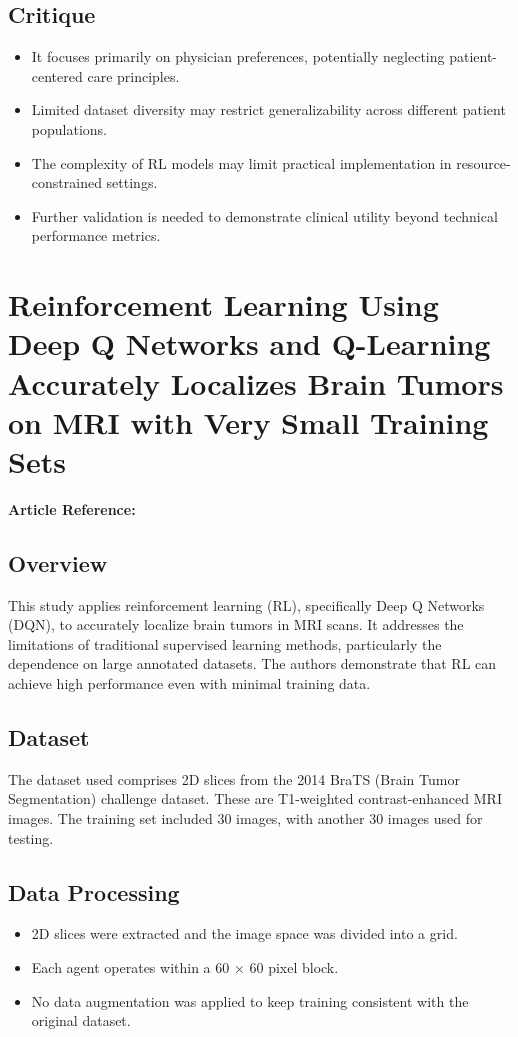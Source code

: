 \subsection*{Critique}
\begin{itemize}
    \item It focuses primarily on physician preferences, potentially neglecting patient-centered care principles.
    \item Limited dataset diversity may restrict generalizability across different patient populations.
    \item The complexity of RL models may limit practical implementation in resource-constrained settings.
    \item Further validation is needed to demonstrate clinical utility beyond technical performance metrics.
\end{itemize}


\section{Reinforcement Learning Using Deep Q Networks and Q-Learning Accurately Localizes Brain Tumors on MRI with Very Small Training Sets}
\textbf{Article Reference:} \cite{article_12}

\subsection*{Overview}
This study applies reinforcement learning (RL), specifically Deep Q Networks (DQN), to accurately localize brain tumors in MRI scans. It addresses the limitations of traditional supervised learning methods, particularly the dependence on large annotated datasets. The authors demonstrate that RL can achieve high performance even with minimal training data.

\subsection*{Dataset}
The dataset used comprises 2D slices from the 2014 BraTS (Brain Tumor Segmentation) challenge dataset. These are T1-weighted contrast-enhanced MRI images. The training set included 30 images, with another 30 images used for testing.

\subsection*{Data Processing}
\begin{itemize}
    \item 2D slices were extracted and the image space was divided into a grid.
    \item Each agent operates within a 60 × 60 pixel block.
    \item No data augmentation was applied to keep training consistent with the original dataset.
\end{itemize}

